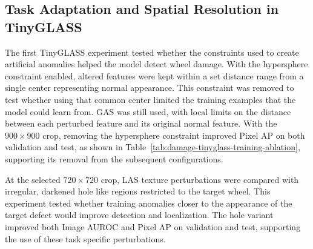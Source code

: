 \subsection{Task Adaptation and Spatial Resolution in TinyGLASS}
\label{sec:damage-tinyglass-ablation}

The first TinyGLASS experiment tested whether the constraints used to create artificial anomalies helped the model detect wheel damage. With the hypersphere constraint enabled, altered features were kept within a set distance range from a single center representing normal appearance. This constraint was removed to test whether using that common center limited the training examples that the model could learn from. GAS was still used, with local limits on the distance between each perturbed feature and its original normal feature. With the \(900\times900\) crop, removing the hypersphere constraint improved Pixel AP on both validation and test, as shown in Table~\ref{tab:damage-tinyglass-training-ablation}, supporting its removal from the subsequent configurations.

At the selected \(720\times720\) crop, LAS texture perturbations were compared with irregular, darkened hole like regions restricted to the target wheel. This experiment tested whether training anomalies closer to the appearance of the target defect would improve detection and localization. The hole variant improved both Image AUROC and Pixel AP on validation and test, supporting the use of these task specific perturbations.


